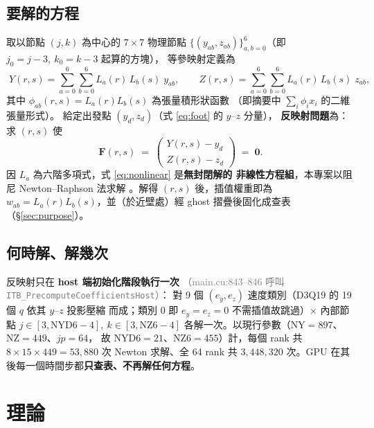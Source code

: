 \documentclass[11pt,a4paper]{article}
\newcommand{\code}[1]{\texttt{#1}}
\newcommand{\filewhere}[1]{\textcolor{gray}{\small（#1）}}
\begin{document}
\subsection{要解的方程}
\label{sec:problem}
取以節點 $(j,k)$ 為中心的 $7\times 7$ 物理節點
$\{(y_{ab},z_{ab})\}_{a,b=0}^{6}$（即 $j_0=j-3,\ k_0=k-3$ 起算的方塊），
等參映射定義為
\begin{equation}
\boxed{\;
Y(r,s)=\sum_{a=0}^{6}\sum_{b=0}^{6}L_a(r)\,L_b(s)\;y_{ab},
\qquad
Z(r,s)=\sum_{a=0}^{6}\sum_{b=0}^{6}L_a(r)\,L_b(s)\;z_{ab},
\;}
\label{eq:isomap}
\end{equation}
其中 $\phi_{ab}(r,s)=L_a(r)L_b(s)$ 為張量積形狀函數
（即摘要中 $\sum_i\phi_i x_i$ 的二維張量形式）。
給定出發點 $(y_d,z_d)$（式 \eqref{eq:foot} 的 $y$--$z$ 分量），
\textbf{反映射問題}為：求 $(r,s)$ 使
\begin{equation}
\bm{F}(r,s)\;=\;
\begin{pmatrix} Y(r,s)-y_d \\ Z(r,s)-z_d \end{pmatrix}
\;=\;\bm{0}.
\label{eq:nonlinear}
\end{equation}
因 $L_a$ 為六階多項式，式 \eqref{eq:nonlinear} 是\textbf{無封閉解的
非線性方程組}，本專案以阻尼 Newton--Raphson 法求解
\cite{Press2007,DennisSchnabel1996}。解得 $(r,s)$ 後，插值權重即為
$w_{ab}=L_a(r)L_b(s)$，並（於近壁處）經 ghost 摺疊後固化成查表
（\S\ref{sec:purpose}）。

\subsection{何時解、解幾次}
反映射只在 \textbf{host 端初始化階段執行一次}
\filewhere{main.cu:843--846 呼叫 \code{ITB\_PrecomputeCoefficientsHost}}：
對 9 個 $(e_y,e_z)$ 速度類別（D3Q19 的 19 個 $q$ 依其 $y$--$z$ 投影壓縮
而成；類別 0 即 $e_y{=}e_z{=}0$ 不需插值故跳過）$\times$
內部節點 $j\in[3,\mathrm{NYD6}{-}4],\ k\in[3,\mathrm{NZ6}{-}4]$
各解一次。以現行參數（$\mathrm{NY}=897$、$\mathrm{NZ}=449$、$jp=64$，
故 $\mathrm{NYD6}=21$、$\mathrm{NZ6}=455$）計，每個 rank 共
$8\times15\times449=53{,}880$ 次 Newton 求解、全 64 rank 共
$3{,}448{,}320$ 次。GPU 在其後每一個時間步都\textbf{只查表、不再解任何方程}。

\section{理論}
\label{sec:theory}
\end{document}
